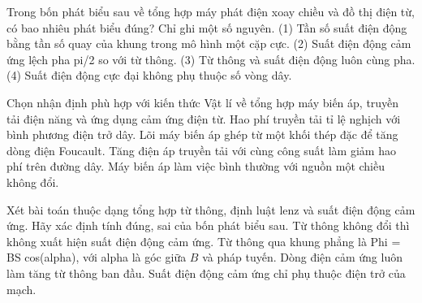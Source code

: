 \begin{ex}
Trong bốn phát biểu sau về tổng hợp máy phát điện xoay chiều và đồ thị điện từ, có bao nhiêu phát biểu đúng? Chỉ ghi một số nguyên. (1) Tần số suất điện động bằng tần số quay của khung trong mô hình một cặp cực. (2) Suất điện động cảm ứng lệch pha pi/2 so với từ thông. (3) Từ thông và suất điện động luôn cùng pha. (4) Suất điện động cực đại không phụ thuộc số vòng dây.
\end{ex}

\begin{ex}
Chọn nhận định phù hợp với kiến thức Vật lí về tổng hợp máy biến áp, truyền tải điện năng và ứng dụng cảm ứng điện từ.
\choice
{Hao phí truyền tải tỉ lệ nghịch với bình phương điện trở dây.}
{Lõi máy biến áp ghép từ một khối thép đặc để tăng dòng điện Foucault.}
{\True Tăng điện áp truyền tải với cùng công suất làm giảm hao phí trên đường dây.}
{Máy biến áp làm việc bình thường với nguồn một chiều không đổi.}
\end{ex}

\begin{ex}
Xét bài toán thuộc dạng tổng hợp từ thông, định luật lenz và suất điện động cảm ứng. Hãy xác định tính đúng, sai của bốn phát biểu sau.
\choiceTF
{\True Từ thông không đổi thì không xuất hiện suất điện động cảm ứng.}
{\True Từ thông qua khung phẳng là Phi = BS cos(alpha), với alpha là góc giữa $B$ và pháp tuyến.}
{Dòng điện cảm ứng luôn làm tăng từ thông ban đầu.}
{Suất điện động cảm ứng chỉ phụ thuộc điện trở của mạch.}
\end{ex}

